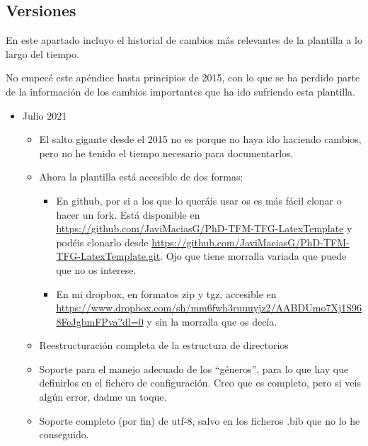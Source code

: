 \documentclass[spanish,openright]{book}
\begin{document}
\begin{appendices}
   

\chapter{Versiones}
\label{cha:versiones}

En este apartado incluyo el historial de cambios más relevantes de la
plantilla a lo largo del tiempo.

No empecé este apéndice hasta principios de 2015, con lo que se ha
perdido parte de la información de los cambios importantes que ha ido
sufriendo esta plantilla.


\begin{itemize}

  
\item Julio 2021
  \begin{itemize}
    
  \item El salto gigante desde el 2015 no es porque no haya ido
    haciendo cambios, pero no he tenido el tiempo necesario para
    documentarlos.
    
  \item Ahora la plantilla está accesible de dos formas:
    \begin{itemize}
    
    \item En github, por si a los que lo queráis usar os es más fácil
      clonar o hacer un fork. Está disponible en
      \url{https://github.com/JaviMaciasG/PhD-TFM-TFG-LatexTemplate} y
      podéis clonarlo desde
      \url{https://github.com/JaviMaciasG/PhD-TFM-TFG-LatexTemplate.git}. Ojo
      que tiene morralla variada que puede que no os interese.
    \item En mi dropbox, en formatos zip y tgz, accesible en
      \url{https://www.dropbox.com/sh/mm6fwh3ruuuyjz2/AABDUmo7Xj1S968FeJgbmFPva?dl=0}
      y sin la morralla que os decía.
      
    \end{itemize}
    
  \item Reestructuración completa de la estructura de directorios
  \item Soporte para el manejo adecuado de los ``géneros'', para lo
    que hay que definirlos en el fichero de configuración. Creo que es
    completo, pero si veis algún error, dadme un toque.
  \item Soporte completo (por fin) de utf-8, salvo en los ficheros
    .bib que no lo he conseguido.    
  \end{itemize}
  

\end{itemize}
\end{appendices}
\end{document}
